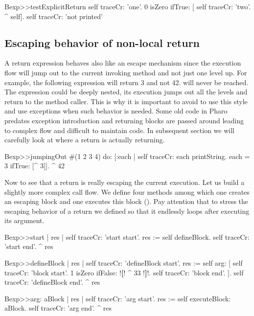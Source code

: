 \documentclass[a4paper,10pt,twoside]{book}
\begin{document}
\begin{code}{}
Bexp>>testExplicitReturn
	self traceCr: 'one'.
	0 isZero ifTrue: [ self traceCr: 'two'. ^ self].
	self traceCr: 'not printed'
\end{code}


%
%


\subsection{Escaping behavior of non-local return}
A return expression behaves also like an escape mechanism since the execution flow will jump out to the current invoking method and not just one level up. For example, the following expression  will return 3 and not 42.  will never be reached. The expression \ct{[ ^3 ]} could be deeply nested, its execution jumps out all the levels and return to the method caller. This is why it is important to avoid to use this style and use exceptions when such behavior is needed. Some old code in Pharo predates exception introduction and returning blocks are passed around leading to complex flow and difficult to maintain code. In subsequent section we will carefully look at where a return is actually returning.

\begin{code}{}
Bexp>>jumpingOut
	#(1 2 3 4) do: [:each |
					self traceCr: each printString.
					each = 3
						ifTrue: [^ 3]].
	^ 42
\end{code}

Now to see that a return is really escaping the current execution. Let us build a slightly more complex call flow.
We define four methods among which one creates an escaping block  and one executes this block (). Pay attention that to stress the escaping behavior of a return we defined  so that it endlessly loops after executing its argument.

\begin{code}{}
Bexp>>start
	| res |
	self traceCr: 'start start'.
	res := self defineBlock.
	self traceCr: 'start end'.
	^ res

Bexp>>defineBlock
	| res |
	self traceCr: 'defineBlock start'.
	res := self arg: [ self traceCr: 'block start'.
                            1 isZero ifFalse: !\textbf{[}! ^ 33 !\textbf{]}!.
                            self traceCr: 'block end'. ].
	self traceCr: 'defineBlock end'.
	^ res

Bexp>>arg: aBlock
	| res |
	self traceCr: 'arg start'.
	res := self executeBlock: aBlock.
	self traceCr: 'arg end'.
	^ res
\end{code}
\end{document}
